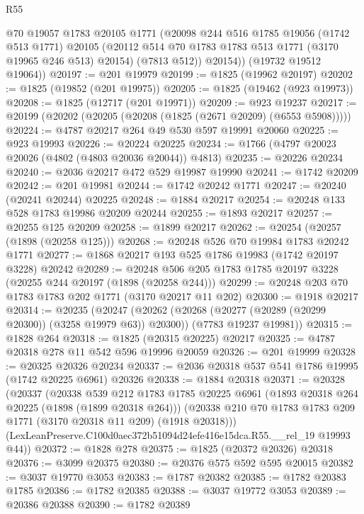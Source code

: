 \begin{lexlean}{R55}
\begin{coremodule}
          @70
          @19057
          @1783
          @20105
          @1771
          (@20098
            @244
            @516
            @1785
            @19056
            (@1742 @513 @1771)
            @20105
            (@20112 @514 @70 @1783 @1783 @513 @1771 (@3170 @19965 @246 @513) @20154)
            (@7813 @512))
          @20154))
      (@19732 @19512 @19064))
@20197 := @201 @19979
@20199 := @1825 (@19962 @20197)
@20202 := @1825 (@19852 (@201 @19975))
@20205 := @1825 (@19462 (@923 @19973))
@20208 := @1825 (@12717 (@201 @19971))
@20209 := @923 @19237
@20217 := @20199 (@20202 (@20205 (@20208 (@1825 (@2671 @20209) (@6553 @5908)))))
@20224 := @4787 @20217 @264 @49 @530 @597 @19991 @20060
@20225 := @923 @19993
@20226 := @20224 @20225
@20234 := @1766 (@4797 @20023 @20026 (@4802 (@4803 @20036 @20044)) @4813)
@20235 := @20226 @20234
@20240 := @2036 @20217 @472 @529 @19987 @19990
@20241 := @1742 @20209
@20242 := @201 @19981
@20244 := @1742 @20242 @1771
@20247 := @20240 (@20241 @20244) @20225
@20248 := @1884 @20217
@20254 := @20248 @133 @528 @1783 @19986 @20209 @20244
@20255 := @1893 @20217
@20257 := @20255 @125 @20209
@20258 := @1899 @20217
@20262 := @20254 (@20257 (@1898 (@20258 @125)))
@20268 := @20248 @526 @70 @19984 @1783 @20242 @1771
@20277 := @1868 @20217 @193 @525 @1786 @19983 (@1742 @20197 @3228) @20242
@20289 := @20248 @506 @205 @1783 @1785 @20197 @3228 (@20255 @244 @20197 (@1898 (@20258 @244)))
@20299 := @20248 @203 @70 @1783 @1783 @202 @1771 (@3170 @20217 @11 @202)
@20300 := @1918 @20217
@20314 := @20235
    (@20247
      (@20262 (@20268 (@20277 (@20289 (@20299 @20300)) (@3258 @19979 @63)) @20300))
      (@7783 @19237 @19981))
@20315 := @1828 @264
@20318 := @1825 (@20315 @20225) @20217
@20325 := @4787 @20318 @278 @11 @542 @596 @19996 @20059
@20326 := @201 @19999
@20328 := @20325 @20326 @20234
@20337 := @2036 @20318 @537 @541 @1786 @19995 (@1742 @20225 @6961) @20326
@20338 := @1884 @20318
@20371 := @20328
    (@20337
      (@20338
        @539
        @212
        @1783
        @1785
        @20225
        @6961
        (@1893 @20318 @264 @20225 (@1898 (@1899 @20318 @264)))
        (@20338 @210 @70 @1783 @1783 @209 @1771 (@3170 @20318 @11 @209) (@1918 @20318)))
      (LexLeanPreserve.C100d0aec372b51094d24efe416e15dca.R55.__rel_19 @19993 @44))
@20372 := @1828 @278
@20375 := @1825 (@20372 @20326) @20318
@20376 := @3099 @20375
@20380 := @20376 @575 @592 @595 @20015
@20382 := @3037 @19770 @3053
@20383 := @1787 @20382
@20385 := @1782 @20383 @1785
@20386 := @1782 @20385
@20388 := @3037 @19772 @3053
@20389 := @20386 @20388
@20390 := @1782 @20389

\end{coremodule}
\end{lexlean}

